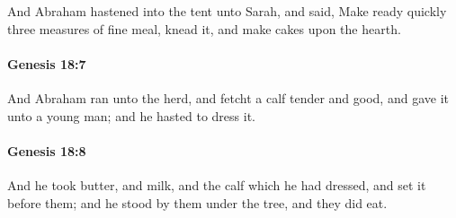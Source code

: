 			And Abraham hastened into the tent unto Sarah, and said, Make ready quickly three measures of fine meal, knead it, and make cakes upon the hearth.


		\paragraph{Genesis 18:7} %
			\label{GENESIS-18-7}

			And Abraham ran unto the herd, and fetcht a calf tender and good, and gave it unto a young man; and he hasted to dress it.


		\paragraph{Genesis 18:8} %
			\label{GENESIS-18-8}

			And he took butter, and milk, and the calf which he had dressed, and set it before them; and he stood by them under the tree, and they did eat.


